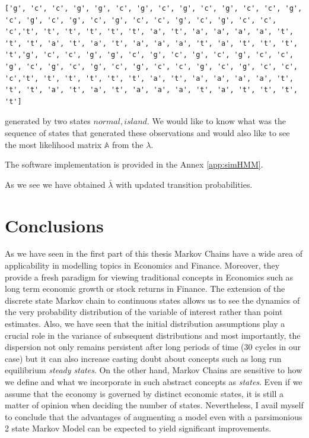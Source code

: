 \documentclass[a4paper,12pt]{article}
\theoremstyle{definition}
\begin{document}
\begin{lstlisting}
['g', 'c', 'c', 'g', 'g', 'c', 'g', 'c', 'g', 'c', 'g', 'c', 'c', 'g', 'c', 'g', 'c', 'g', 'c', 'g', 'c', 'c', 'g', 'c', 'g', 'c', 'c', 'c','t', 't', 't', 't', 't', 't', 'a', 't', 'a', 'a', 'a', 'a', 't', 't', 't', 'a', 't', 'a', 't', 'a', 'a', 'a', 't', 'a', 't', 't', 't', 't','g', 'c', 'c', 'g', 'g', 'c', 'g', 'c', 'g', 'c', 'g', 'c', 'c', 'g', 'c', 'g', 'c', 'g', 'c', 'g', 'c', 'c', 'g', 'c', 'g', 'c', 'c', 'c','t', 't', 't', 't', 't', 't', 'a', 't', 'a', 'a', 'a', 'a', 't', 't', 't', 'a', 't', 'a', 't', 'a', 'a', 'a', 't', 'a', 't', 't', 't', 't']
\end{lstlisting}
generated by two states $normal, island$. We would like to know what was the sequence of states that generated these observations and would also like to see the most likelihood matrix $\mathbb{A}$ from the $\lambda$.

The software implementation is provided in the Annex \ref{app:simHMM}. 


As we see we have obtained $\bar{\lambda}$ with updated transition probabilities. 



\newpage
\section{Conclusions}
As we have seen in the first part of this thesis Markov Chains have a wide area of applicability in modelling topics in Economics and Finance. Moreover, they provide a fresh paradigm for viewing traditional concepts in Economics such as long term economic growth or stock returns in Finance. The extension of the discrete state Markov chain to continuous states allows us to see the dynamics of the very probability distribution of the variable of interest rather than point estimates. Also, we have seen that the initial distribution assumptions play a crucial role in the variance of subsequent distributions and most importantly, the dispersion not only remains persistent after long periods of time (30 cycles in our case) but it can also increase casting doubt about concepts such as long run equilibrium \textit{steady states}. On the other hand, Markov Chains are sensitive to how we define and what we incorporate in such abstract concepts as \textit{states}. Even if we assume that the economy is governed by distinct economic states, it is still a matter of opinion when deciding the number of states. Nevertheless, I avail myself to conclude that the advantages of augmenting a model even with a parsimonious 2 state Markov Model can be expected to yield significant improvements. 
\end{document}
